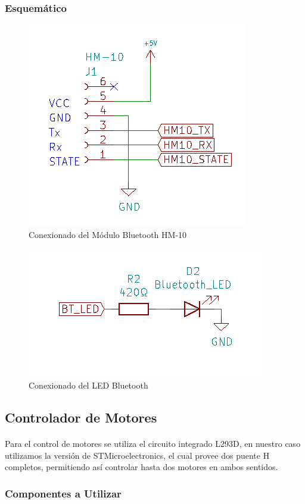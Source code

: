\subsubsection{Esquemático}

\begin{figure}[H]
	\centering
	\includegraphics[width=0.5\linewidth]{informe_3/schem_hm10}
	\caption{Conexionado del Módulo Bluetooth HM-10}
	\label{fig:schemhm10}
\end{figure}

\begin{figure}[H]
	\centering
	\includegraphics[width=0.5\linewidth]{informe_3/schem_bt_led}
	\caption{Conexionado del LED Bluetooth}
	\label{fig:schemledbt}
\end{figure}

\subsection{Controlador de Motores}

\paragraph{}Para el control de motores se utiliza el circuito integrado L293D, en nuestro 
caso utilizamos la versión de STMicroelectronics, el cual provee dos puente H completos,
permitiendo así controlar hasta dos motores en ambos sentidos.

\subsubsection{Componentes a Utilizar}

